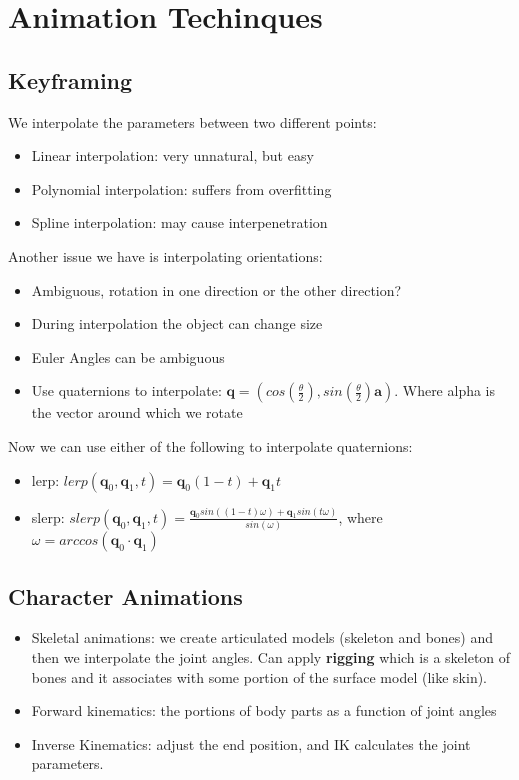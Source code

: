 \documentclass[a4paper]{article}
\begin{document}
\section{Animation Techinques}
\subsection*{Keyframing}
We interpolate the parameters between two different points:
\begin{itemize}
    \item Linear interpolation: very unnatural, but easy
    \item Polynomial interpolation: suffers from overfitting
    \item Spline interpolation: may cause interpenetration
\end{itemize}
Another issue we have is interpolating orientations:
\begin{itemize}
    \item Ambiguous, rotation in one direction or the other direction?
    \item During interpolation the object can change size
    \item Euler Angles can be ambiguous
    \item Use quaternions to interpolate: $\textbf{q} = (cos(\frac{\theta}{2}), sin(\frac{\theta}{2}) \textbf{a} ) $. Where alpha is the vector around which we rotate
\end{itemize}

Now we can use either of the following to interpolate quaternions:
\begin{itemize}
    \item lerp: $lerp(\textbf{q}_0, \textbf{q}_1, t) = \textbf{q}_0 (1-t) + \textbf{q}_1 t$
    \item slerp: $slerp(\textbf{q}_0, \textbf{q}_1, t) = \frac{\textbf{q}_0 sin((1-t)\omega) + \textbf{q}_1 sin(t \omega) }{sin(\omega)}$, where $\omega = arccos(\textbf{q}_0 \cdot \textbf{q}_1  )$   
\end{itemize}


\subsection{Character Animations}
\begin{itemize}
    \item Skeletal animations: we create articulated models (skeleton and bones) and then we interpolate the joint angles. Can apply \textbf{rigging} which is a skeleton of bones and it associates with some portion of the surface model (like skin).
    \item Forward kinematics: the portions of body parts as a function of joint angles
    \item Inverse Kinematics: adjust the end position, and IK calculates the joint parameters.
\end{itemize}
\end{document}
